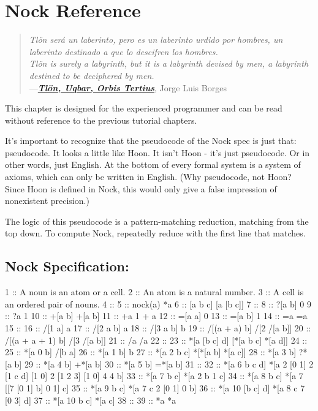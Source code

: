 \chapter{Nock Reference}

\begin{quote}
\noindent \emph{Tlön será un laberinto, pero es un laberinto urdido por hombres, un
laberinto destinado a que lo descifren los hombres.}
\medskip \\
\noindent \emph{Tlön is surely a labyrinth, but it is a labyrinth devised
by men, a labyrinth destined to be deciphered by men.}
\medskip \\
\noindent ---\href{https://en.wikipedia.org/wiki/Tlon,_Uqbar,_Orbis_Tertius}{\textbf{\emph{Tlön, Uqbar, Orbis Tertius}}}, Jorge Luis Borges
\end{quote}

This chapter is designed for the experienced programmer and can be read without reference to the previous tutorial chapters.

It's important to recognize that the pseudocode of the Nock spec is just that:
pseudocode.  It looks a little like Hoon.  It isn't Hoon - it's just
pseudocode.  Or in other words, just English.  At the bottom of every formal
system is a system of axioms, which can only be written in English.  (Why
pseudocode, not Hoon?  Since Hoon is defined in Nock, this would only give a
false impression of nonexistent precision.)

The logic of this pseudocode is a pattern-matching reduction, matching from the
top down.  To compute Nock, repeatedly reduce with the first line that matches.

\section{Nock Specification:}

\begin{code}
1  ::    A noun is an atom or a cell.
2  ::    An atom is a natural number.
3  ::    A cell is an ordered pair of nouns.
4  ::
5  ::    nock(a)          *a
6  ::    [a b c]          [a [b c]]
7  ::
8  ::    ?[a b]           0
9  ::    ?a               1
10 ::    +[a b]           +[a b]
11 ::    +a               1 + a
12 ::    =[a a]           0
13 ::    =[a b]           1
14 ::    =a               =a
15 ::
16 ::    /[1 a]           a
17 ::    /[2 a b]         a
18 ::    /[3 a b]         b
19 ::    /[(a + a) b]     /[2 /[a b]]
20 ::    /[(a + a + 1) b] /[3 /[a b]]
21 ::    /a               /a
22 ::
23 ::    *[a [b c] d]     [*[a b c] *[a d]]
24 ::
25 ::    *[a 0 b]         /[b a]
26 ::    *[a 1 b]         b
27 ::    *[a 2 b c]       *[*[a b] *[a c]]
28 ::    *[a 3 b]         ?*[a b]
29 ::    *[a 4 b]         +*[a b]
30 ::    *[a 5 b]         =*[a b]
31 ::
32 ::    *[a 6 b c d]     *[a 2 [0 1] 2 [1 c d] [1 0] 2 [1 2 3] [1 0] 4 4 b]
33 ::    *[a 7 b c]       *[a 2 b 1 c]
34 ::    *[a 8 b c]       *[a 7 [[7 [0 1] b] 0 1] c]
35 ::    *[a 9 b c]       *[a 7 c 2 [0 1] 0 b]
36 ::    *[a 10 [b c] d]  *[a 8 c 7 [0 3] d]
37 ::    *[a 10 b c]      *[a c]
38 ::
39 ::    *a               *a
\end{code}

